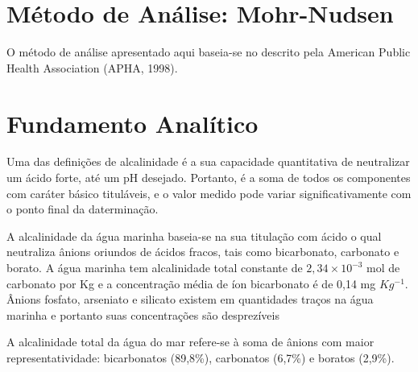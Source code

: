 \documentclass[a4paper,10pt]{SelfArx}
\affiliation{~} %
\begin{document}
\flushbottom %
\maketitle %
\renewcommand{\contentsname}{Conteúdo}
\tableofcontents %
\thispagestyle{empty} %

\section*{Método de Análise: Mohr-Nudsen} %
O método de análise apresentado aqui baseia-se no descrito pela American Public Health Association (APHA, 1998).

\section{Fundamento Analítico}

Uma das definições de alcalinidade é a sua capacidade quantitativa de neutralizar um ácido forte, até um pH desejado. Portanto, é a soma de todos os componentes com caráter básico tituláveis, e o valor medido pode variar significativamente com o ponto final da daterminação. 

A alcalinidade da água marinha baseia-se na sua titulação com ácido o qual neutraliza ânions oriundos de ácidos fracos, tais como bicarbonato, carbonato e borato. A água marinha tem alcalinidade total constante de $2,34\times 10^{-3}$ mol de carbonato por Kg e a concentração média de íon bicarbonato é de 0,14 mg $Kg^{-1}$. Ânions fosfato, arseniato e silicato existem em quantidades traços na água marinha e portanto suas concentrações são desprezíveis 

A alcalinidade total da água do mar refere-se à soma de ânions com maior representatividade: bicarbonatos (89,8\%), carbonatos (6,7\%) e boratos (2,9\%).
\end{document}
